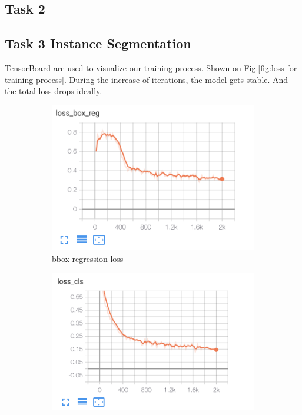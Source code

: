 \documentclass[conference]{IEEEtran}
\begin{document}
\subsection{Task 2}

\subsection{Task 3 Instance Segmentation}

TensorBoard are used to visualize our training process.
Shown on Fig.\ref{fig:loss for training process}.
During the increase of iterations, the model gets stable.
And the total loss drops ideally.

\begin{figure}[h!]
\centering
\begin{subfigure}[h!]{0.24\textwidth}
    \centering
    \includegraphics[width=\textwidth]{img/loss_bbox_reg.png}
    \caption{bbox regression loss}
    \label{fig:loss_bbox}
\end{subfigure}
\hfill
\begin{subfigure}[h!]{0.24\textwidth}
    \centering
    \includegraphics[width=\textwidth]{img/loss_cls.png}

\end{subfigure}
\end{figure}
\end{document}
